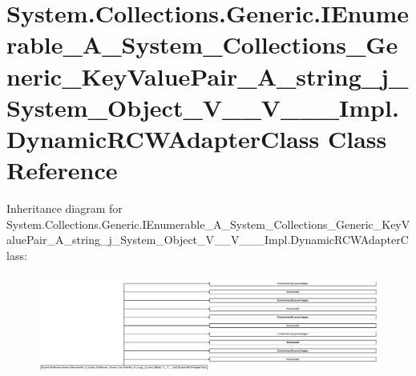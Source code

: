 \hypertarget{class_system_1_1_collections_1_1_generic_1_1_i_enumerable___a___system___collections___generic__b93c833dd18f53df29453770fcef109b}{}\section{System.\+Collections.\+Generic.\+I\+Enumerable\+\_\+\+A\+\_\+\+System\+\_\+\+Collections\+\_\+\+Generic\+\_\+\+Key\+Value\+Pair\+\_\+\+A\+\_\+string\+\_\+j\+\_\+\+System\+\_\+\+Object\+\_\+\+V\+\_\+\+\_\+\+V\+\_\+\+\_\+\+\_\+\+Impl.\+Dynamic\+R\+C\+W\+Adapter\+Class Class Reference}
\label{class_system_1_1_collections_1_1_generic_1_1_i_enumerable___a___system___collections___generic__b93c833dd18f53df29453770fcef109b}
Inheritance diagram for System.\+Collections.\+Generic.\+I\+Enumerable\+\_\+\+A\+\_\+\+System\+\_\+\+Collections\+\_\+\+Generic\+\_\+\+Key\+Value\+Pair\+\_\+\+A\+\_\+string\+\_\+j\+\_\+\+System\+\_\+\+Object\+\_\+\+V\+\_\+\+\_\+\+V\+\_\+\+\_\+\+\_\+\+Impl.\+Dynamic\+R\+C\+W\+Adapter\+Class\+:\begin{figure}[H]
\begin{center}
\leavevmode
\includegraphics[height=3.377193cm]{class_system_1_1_collections_1_1_generic_1_1_i_enumerable___a___system___collections___generic__b93c833dd18f53df29453770fcef109b}
\end{center}
\end{figure}
